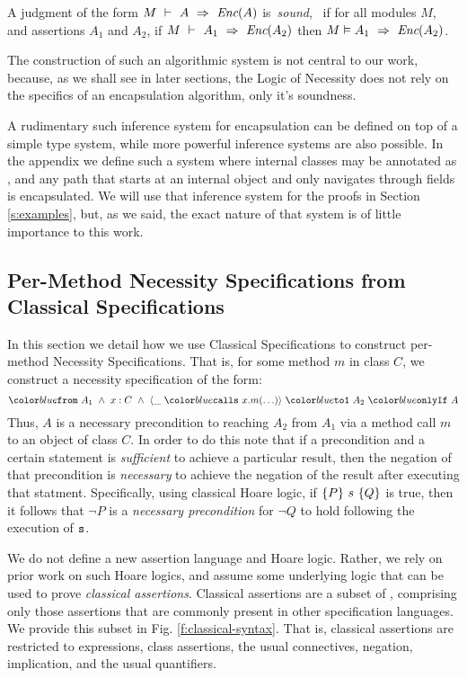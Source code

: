 \begin{definition}
\label{lem:encap-soundness}
A judgment of the form $M\ \vdash\ A\ \Rightarrow\ \textit{Enc}(A)$  is\  \emph{sound}, \ if 
for all modules $M$, and assertions $A_1$ and $A_2$, if 
$M\ \vdash\ A_1\ \Rightarrow\ \textit{Enc}(A_2)$ then $M \vDash A_1\ \Rightarrow\ \textit{Enc}(A_2)$.
\end{definition}


The construction of such an algorithmic system is not central to our work,
because, as we shall see in later sections,  the Logic of Necessity 
does not rely on the specifics of an encapsulation algorithm, only it's soundness.

A rudimentary such inference system for encapsulation 
can be defined on top of a simple type system, while 
more powerful inference systems are also possible. 
In the appendix we define such a system where internal classes
may be annotated as , and any path that starts at an internal object and
only navigates through  fields is encapsulated. 
We will use that inference system for the proofs in Section \ref{s:examples}, but, as
we said, the exact nature of that system is of little importance to this work. 


\subsection{Per-Method Necessity Specifications from Classical Specifications}
\label{s:classical-proof}
In this section we detail how we use Classical Specifications
to construct per-method Necessity Specifications. 
That is, for some method $m$ in class $C$, we construct a necessity specification of the form:
$$\onlyIfSingle{A_1\ \wedge\ x : C\ \wedge\ \calls{\_}{x}{m}{\ldots}}{A_2}{A}$$
Thus, $A$ is a necessary precondition to reaching $A_2$ from $A_1$ via a method call $m$ to an object of class $C$.
In order to do this
note that if a precondition and a certain statement is \emph{sufficient}
to achieve a particular result, then the negation of that precondition
is \emph{necessary} to achieve the negation of the result after executing that statment.
Specifically, 
using classical Hoare logic, if $\{P\}\ s\ \{Q\}$ is true, then 
it follows that $\neg P$ is a \emph{necessary precondition} for $\neg Q$ to 
hold following the execution of ${\texttt{s}}$.

We do not define a new assertion language and Hoare logic.
 Rather, we rely on prior work on such Hoare logics,
  and assume some underlying logic that can be used 
to prove  \emph{classical assertions}. 
Classical assertions are a subset of \SpecO, comprising only those 
assertions that are commonly present in other specification languages.
We provide this subset in Fig. \ref{f:classical-syntax}. That is, classical assertions
are restricted to expressions, class assertions, the usual connectives, negation, 
implication, and the usual quantifiers.


